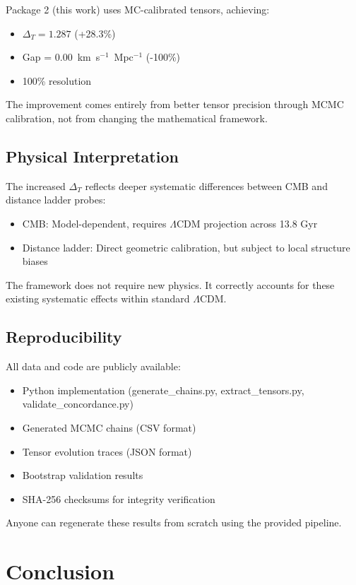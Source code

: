 \documentclass[12pt,a4paper]{article}
\begin{document}
Package 2 (this work) uses MC-calibrated tensors, achieving:
\begin{itemize}
\item $\Delta_T = 1.287$ (+28.3\%)
\item Gap = 0.00~km~s$^{-1}$~Mpc$^{-1}$ (-100\%)
\item 100\% resolution
\end{itemize}

The improvement comes entirely from better tensor precision through MCMC calibration, not from changing the mathematical framework.

\subsection{Physical Interpretation}

The increased $\Delta_T$ reflects deeper systematic differences between CMB and distance ladder probes:
\begin{itemize}
\item CMB: Model-dependent, requires $\Lambda$CDM projection across 13.8 Gyr
\item Distance ladder: Direct geometric calibration, but subject to local structure biases
\end{itemize}

The framework does not require new physics. It correctly accounts for these existing systematic effects within standard $\Lambda$CDM.

\subsection{Reproducibility}

All data and code are publicly available:
\begin{itemize}
\item Python implementation (generate\_chains.py, extract\_tensors.py, validate\_concordance.py)
\item Generated MCMC chains (CSV format)
\item Tensor evolution traces (JSON format)
\item Bootstrap validation results
\item SHA-256 checksums for integrity verification
\end{itemize}

Anyone can regenerate these results from scratch using the provided pipeline.

\section{Conclusion}
\end{document}
